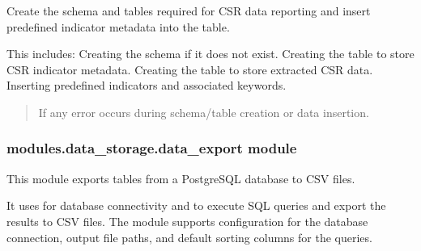 \documentclass[letterpaper,10pt,english]{sphinxmanual}
\begin{document}
\begin{fulllineitems}
\label{\detokenize{modules.data_storage:modules.data_storage.create_table.create_table_and_insert_data}}
\pysigstartsignatures
\pysiglinewithargsret
{}
{}
{}
\pysigstopsignatures
\sphinxAtStartPar
Create the schema and tables required for CSR data reporting and
insert predefined indicator metadata into the  table.

\sphinxAtStartPar
This includes:
\sphinxhyphen{} Creating the  schema if it does not exist.
\sphinxhyphen{} Creating the  table to store CSR indicator metadata.
\sphinxhyphen{} Creating the  table to store extracted CSR data.
\sphinxhyphen{} Inserting predefined indicators and associated keywords.
\begin{quote}\begin{description}
\sphinxAtStartPar
{} \textendash{} If any error occurs during schema/table creation or data insertion.

\end{description}\end{quote}

\end{fulllineitems}



\subsubsection{modules.data\_storage.data\_export module}
\label{\detokenize{modules.data_storage:module-modules.data_storage.data_export}}\label{\detokenize{modules.data_storage:modules-data-storage-data-export-module}}
\sphinxAtStartPar
This module exports tables from a PostgreSQL database to CSV files.

\sphinxAtStartPar
It uses  for database connectivity and  to execute SQL queries and export the results
to CSV files. The module supports configuration for the database connection, output file paths,
and default sorting columns for the queries.
\end{document}
